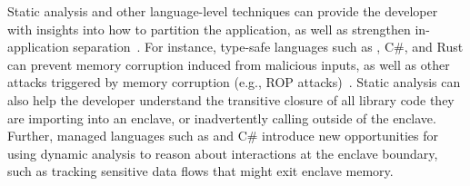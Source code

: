Static analysis and other language-level techniques can provide the developer with
insights into how
to partition the application, as well as strengthen in-application separation~\cite{bittau2008wedge,brumley2004privtrans,khatiwala2006data}.
For instance, type-safe languages such as \java{}, C\#, and Rust can prevent memory corruption induced from malicious inputs,
as well as other attacks triggered by memory corruption (e.g., ROP attacks)~\cite{shacham2007geometry}.
Static analysis can also help the developer understand the transitive closure of all
library code they are importing into an enclave, or inadvertently calling outside of the enclave.
Further, managed languages such as \java{} and C\# introduce new opportunities for using dynamic analysis to
reason about interactions at the enclave boundary, such as tracking sensitive data flows that might exit enclave memory.




